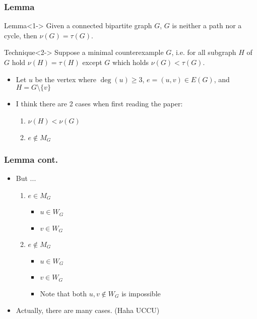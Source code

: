 \documentclass{beamer}
\begin{document}
\begin{frame}
  \frametitle{Lemma}
  \begin{exampleblock}{Lemma}<1->
  Given a connected bipartite graph $G$, $G$ is neither a path nor a cycle, then $\nu{(G)}=\tau{(G)}$.
  \end{exampleblock}
  \begin{alertblock}{Technique}<2->
  Suppose a minimal counterexample $G$, i.e. for all subgraph $H$ of $G$ hold $\nu{(H)}=\tau{(H)}$ except $G$ which holds $\nu{(G)}<\tau{(G)}$.
  \end{alertblock}
  \begin{itemize}
  \item<3-> Let $u$ be the vertex where $\deg{(u)}\geq{3}$, $e=(u,v)\in{E(G)}$, and $H=G\setminus{\{v\}}$
  \item<4-> I think there are 2 cases when first reading the paper:
    \begin{enumerate}
    \item<5-> $\nu{(H)}<\nu{(G)}$ 
    \item<6-> $e\notin{M_G}$
    \end{enumerate}
  \end{itemize}
\end{frame}

\begin{frame}
  \frametitle{Lemma cont.}
  \begin{itemize}
  \item<1-> But ...
    \begin{enumerate}
    \item<2-> $e\in{M_G}$ 
      \begin{itemize}
      \item<3-> $u\in{W_G}$ 
      \item<3-> $v\in{W_G}$ 
      \end{itemize}
    \item<2-> $e\notin{M_G}$ 
      \begin{itemize}
      \item<4-> $u\in{W_G}$ 
      \item<4-> $v\in{W_G}$ 
      \item<5-> Note that both $u,v\notin{W_G}$ is impossible 
      \end{itemize}
    \end{enumerate}
  \item<9-> Actually, there are \alert{many} cases. (Haha UCCU)
  \end{itemize}
\end{frame}
\end{document}

